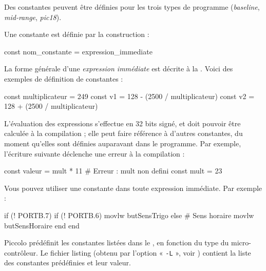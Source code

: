 

\thispagestyle{empty}

Des constantes peuvent être définies pour les trois types de programme (\emph{baseline}, \emph{mid-range}, \emph{pic18}).

Une constante est définie par la construction :

\begin{piccolo}
const nom_constante = expression_immediate
\end{piccolo}


La forme générale d’une \emph{expression immédiate} est décrite à la . Voici des exemples de définition de constantes :

\begin{piccolo}
const multiplicateur = 249
const v1 = 128 - (2500 / multiplicateur)
const v2 = 128 + (2500 / multiplicateur)
\end{piccolo}

L’évaluation des expressions s’effectue en 32 bits signé, et doit pouvoir être calculée à la compilation ; elle peut faire référence à d’autres constantes, du moment qu’elles sont définies auparavant dans le programme. Par exemple, l’écriture suivante déclenche une erreur à la compilation :

\begin{piccolo}
const valeur = mult * 11 # Erreur : mult non defini
const mult = 23 
\end{piccolo}

Vous pouvez utiliser une constante dans toute expression immédiate. Par exemple :

\begin{piccolo}
if (! PORTB.7)
  if (! PORTB.6)
     movlw butSensTrigo
   else # Sens horaire
     movlw butSensHoraire
  end
end
\end{piccolo}



Piccolo prédéfinit les constantes listées dans le , en fonction du type du micro-contrôleur. Le fichier listing (obtenu par l'option « \texttt{-L} », voir ) contient la liste des constantes prédéfinies et leur valeur.

